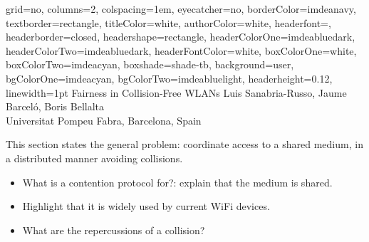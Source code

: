 \documentclass[portrait,a0paper]{baposter}
\begin{document}
\begin{poster}
{
	grid=no,
	columns=2,
	colspacing=1em,
	eyecatcher=no,
	borderColor=imdeanavy,
	textborder=rectangle,
    titleColor=white,
    authorColor=white,
	headerfont=\textsf,
	headerborder=closed,
	headershape=rectangle,
	headerColorOne=imdeabluedark,
	headerColorTwo=imdeabluedark,
	headerFontColor=white,
	boxColorOne=white,
	boxColorTwo=imdeacyan,
	boxshade=shade-tb,
	background=user,
	bgColorOne=imdeacyan,
	bgColorTwo=imdeabluelight,
	headerheight=0.12\textheight,
	linewidth=1pt
}
{
}
{Fairness in Collision-Free WLANs}
{
	Luis Sanabria-Russo, Jaume Barcel{\'o}, Boris Bellalta\vspace{0.5em}\\
	\normalsize Universitat Pompeu Fabra, Barcelona, Spain
}

{
This section states the general problem: coordinate access to a shared medium, in a distributed manner avoiding collisions.
\begin{itemize}
 \item What is a contention protocol for?: explain that the medium is shared.
 \item Highlight that it is widely used by current WiFi devices.
 \item What are the repercussions of a collision?
\end{itemize}

}



\end{poster}
\end{document}
